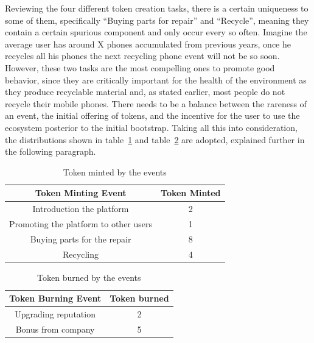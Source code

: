 \documentclass[11pt]{scrartcl}
\begin{document}
Reviewing the four different token creation tasks, there is a certain uniqueness to some of them, specifically ``Buying parts for repair'' and ``Recycle'', meaning they contain a certain spurious component and only occur every so often. Imagine the average user has around X phones accumulated from previous years, once he recycles all his phones the next recycling phone event will not be so soon. However, these two tasks are the most compelling ones to promote good behavior, since they are critically important for the health of the environment as they produce recyclable material and, as stated earlier, most people do not recycle their mobile phones. There needs to be a balance between the rareness of an event, the initial offering of tokens, and the incentive for the user to use the ecosystem posterior to the initial bootstrap.  Taking all this into consideration, the distributions shown in table~\ref{tbl:mint_evt} and table~\ref{tbl:tok_burn} are adopted, explained further in the following paragraph.

\begin{table}[H]
    \centering
    \begin{tabular}{c c}
        \toprule
        Token Minting Event & Token Minted \\ \midrule
        Introduction the platform & 2 \\ \midrule
        Promoting the platform to other users & 1 \\ \midrule
        Buying parts for the repair & 8 \\ \midrule
        Recycling & 4 \\ \bottomrule
    \end{tabular}
    \caption{Token minted by the events}%
    \label{tbl:mint_evt}
\end{table}

\begin{table}[H]
    \centering
    \begin{tabular}{c c}
        \toprule
        Token Burning Event & Token burned \\ \midrule
        Upgrading reputation & 2 \\ \midrule
        Bonus from company& 5 \\ \bottomrule
    \end{tabular}
    \caption{Token burned by the events}%
    \label{tbl:tok_burn}
\end{table}
\end{document}
